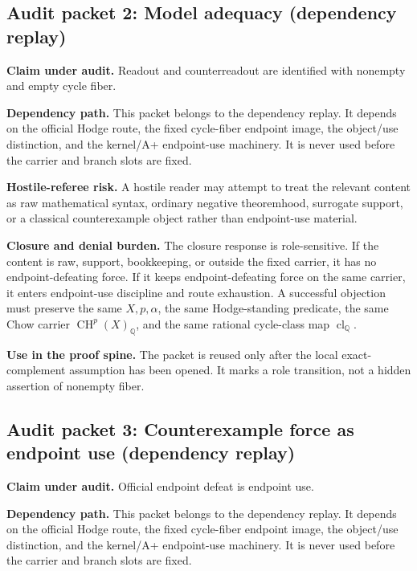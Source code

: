 \documentclass[11pt]{article}
\newcommand{\QQ}{\mathbb{Q}}
\newcommand{\CH}{\operatorname{CH}}
\newcommand{\clQ}{\operatorname{cl}_{\QQ}}
\begin{document}
\subsection{Audit packet 2: Model adequacy (dependency replay)}


\par\noindent\textbf{Claim under audit.} Readout and counterreadout are identified with nonempty and empty cycle fiber.


\par\noindent\textbf{Dependency path.} This packet belongs to the dependency replay. It depends on the official Hodge route, the fixed cycle-fiber endpoint image, the object/use distinction, and the kernel/A+ endpoint-use machinery. It is never used before the carrier and branch slots are fixed.


\par\noindent\textbf{Hostile-referee risk.} A hostile reader may attempt to treat the relevant content as raw mathematical syntax, ordinary negative theoremhood, surrogate support, or a classical counterexample object rather than endpoint-use material.


\par\noindent\textbf{Closure and denial burden.} The closure response is role-sensitive. If the content is raw, support, bookkeeping, or outside the fixed carrier, it has no endpoint-defeating force. If it keeps endpoint-defeating force on the same carrier, it enters endpoint-use discipline and route exhaustion. A successful objection must preserve the same $X,p,\alpha$, the same Hodge-standing predicate, the same Chow carrier $\CH^p(X)_\QQ$, and the same rational cycle-class map $\clQ$.


\par\noindent\textbf{Use in the proof spine.} The packet is reused only after the local exact-complement assumption has been opened. It marks a role transition, not a hidden assertion of nonempty fiber.


\subsection{Audit packet 3: Counterexample force as endpoint use (dependency replay)}


\par\noindent\textbf{Claim under audit.} Official endpoint defeat is endpoint use.


\par\noindent\textbf{Dependency path.} This packet belongs to the dependency replay. It depends on the official Hodge route, the fixed cycle-fiber endpoint image, the object/use distinction, and the kernel/A+ endpoint-use machinery. It is never used before the carrier and branch slots are fixed.
\end{document}
